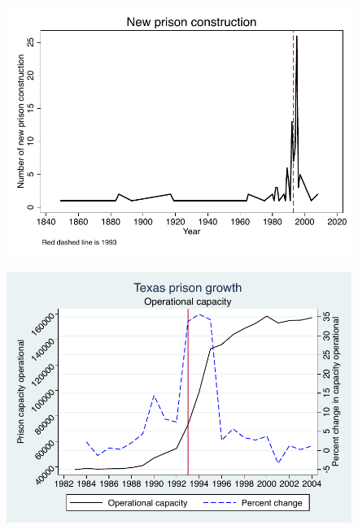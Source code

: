 \documentclass[notes=show]{beamer}
\begin{document}
\begin{frame}[shrink=30,plain]

\begin{figure}
\includegraphics{./lecture_includes/tdcj.pdf}
\end{figure}
\end{frame}


\begin{frame}[shrink=30,plain]
\begin{figure}
\includegraphics{./lecture_includes/capacity_operational_texas.pdf}
\end{figure}
\end{frame}
\end{document}
